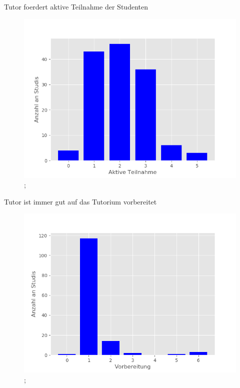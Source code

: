 \documentclass[10pt]{beamer}
\begin{document}
\begin{frame}[fragile]{Tutor foerdert aktive Teilnahme der Studenten} 
 \begin{figure}
 \includegraphics[width= 0.9\linewidth]{./PDFcreater/Plots/Tutor+foerdert+aktive+Teilnahme+der+Studenten.png};
 \end{figure}
 \end{frame}
\begin{frame}[fragile]{Tutor ist immer gut auf das Tutorium vorbereitet} 
 \begin{figure}
 \includegraphics[width= 0.9\linewidth]{./PDFcreater/Plots/Tutor+ist+immer+gut+auf+das+Tutorium+vorbereitet.png};
 \end{figure}
 \end{frame}
\end{document}
